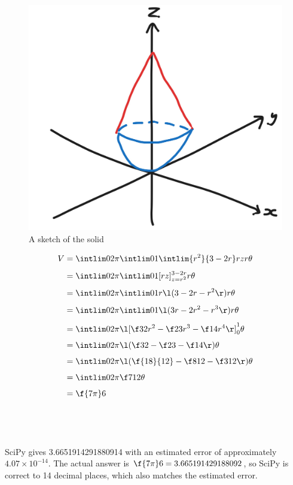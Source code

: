 \documentclass[a4paper]{article}
\begin{document}
\begin{figure}[h]
	\centering
	\includegraphics[scale=0.35]{Q3-sketch}
	\caption{A sketch of the solid}
\end{figure}

\begin{align*}
V &= \intlim 0{2\pi} {\intlim 01 {\intlim {r^2}{3-2r} r z} r} \theta\\[1ex]
&= \intlim 0{2\pi} {\intlim 01 {[rz]_{z=r^2}^{3-2r}} r} \theta\\[1ex]
&= \intlim 0{2\pi} {\intlim 01 {r \l( 3 - 2r - r^2 \r)} r} \theta\\[1ex]
&= \intlim 0{2\pi} {\intlim 01 {\l( 3r - 2r^2 - r^3 \r)} r} \theta\\[1ex]
&= \intlim 0{2\pi} {\l[ \f32 r^2 - \f23 r^3 - \f14 r^4 \r]_0^1} \theta\\[1ex]
&= \intlim 0{2\pi} {\l( \f32 - \f23 - \f14 \r)} \theta\\[1ex]
&= \intlim 0{2\pi} {\l( \f{18}{12} - \f8{12} - \f3{12} \r)} \theta\\[1ex]
&= \intlim 0{2\pi} {\f7{12}} \theta\\[1ex]
&= \f{7\pi}6
\end{align*}

\subsection{~}

SciPy gives 3.6651914291880914 with an estimated error of approximately $4.07 \times 10^{-14}$. The actual answer is $\f{7\pi}6 = 3.665191429188092$, so SciPy is correct to 14 decimal places, which also matches the estimated error.
\end{document}
